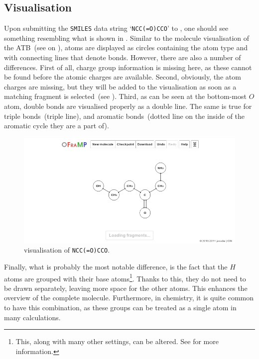 \subsection{Visualisation}
Upon submitting the \verb|SMILES| data string `\verb|NCC(=O)CCO|' to \oframp, one should see something resembling what is shown in . Similar to the molecule visualisation of the ATB~(see  on ), atoms are displayed as circles containing the atom type and with connecting lines that denote bonds. However, there are also a number of differences. First of all, charge group information is missing here, as these cannot be found before the atomic charges are available. Second, obviously, the atom charges are missing, but they will be added to the visualisation as soon as a matching fragment is selected~(see ). Third, as can be seen at the bottom-most $O$ atom, double bonds are visualised properly as a double line. The same is true for triple bonds~(triple line), and aromatic bonds~(dotted line on the inside of the aromatic cycle they are a part of).

\begin{figure}
\center
\includegraphics[width=.9\textwidth]{img/impl_visualising.png}
\caption{\oframp{} visualisation of \texttt{NCC(=O)CCO}.}
\end{figure}

Finally, what is probably the most notable difference, is the fact that the $H$ atoms are grouped with their base atoms\footnote{This, along with many other settings, can be altered. See  for more information.}. Thanks to this, they do not need to be drawn separately, leaving more space for the other atoms. This enhances the overview of the complete molecule. Furthermore, in chemistry, it is quite common to have this combination, as these groups can be treated as a single atom in many calculations.

